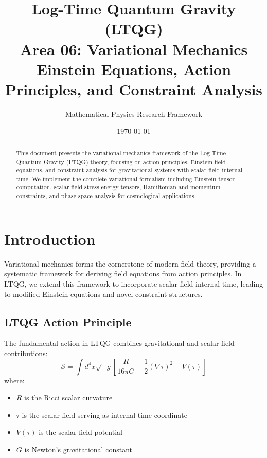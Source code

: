 \documentclass[11pt,a4paper]{article}
\title{\textbf{Log-Time Quantum Gravity (LTQG)}\\
\Large Area 06: Variational Mechanics\\
\large Einstein Equations, Action Principles, and Constraint Analysis}
\author{Mathematical Physics Research Framework}
\date{\today}
\theoremstyle{definition}
\theoremstyle{remark}
\newcommand{\action}{\mathcal{S}}
\newcommand{\covd}{\nabla}
\begin{document}
\maketitle

\begin{abstract}
This document presents the variational mechanics framework of the Log-Time Quantum Gravity (LTQG) theory, focusing on action principles, Einstein field equations, and constraint analysis for gravitational systems with scalar field internal time. We implement the complete variational formalism including Einstein tensor computation, scalar field stress-energy tensors, Hamiltonian and momentum constraints, and phase space analysis for cosmological applications.
\end{abstract}

\tableofcontents
\newpage

\section{Introduction}

Variational mechanics forms the cornerstone of modern field theory, providing a systematic framework for deriving field equations from action principles. In LTQG, we extend this framework to incorporate scalar field internal time, leading to modified Einstein equations and novel constraint structures.

\subsection{LTQG Action Principle}

The fundamental action in LTQG combines gravitational and scalar field contributions:
\begin{equation}
\action = \int d^4x \sqrt{-g} \left[ \frac{R}{16\pi G} + \frac{1}{2}(\covd \tau)^2 - V(\tau) \right]
\end{equation}
where:
\begin{itemize}
\item $R$ is the Ricci scalar curvature
\item $\tau$ is the scalar field serving as internal time coordinate
\item $V(\tau)$ is the scalar field potential
\item $G$ is Newton's gravitational constant
\end{itemize}
\end{document}
